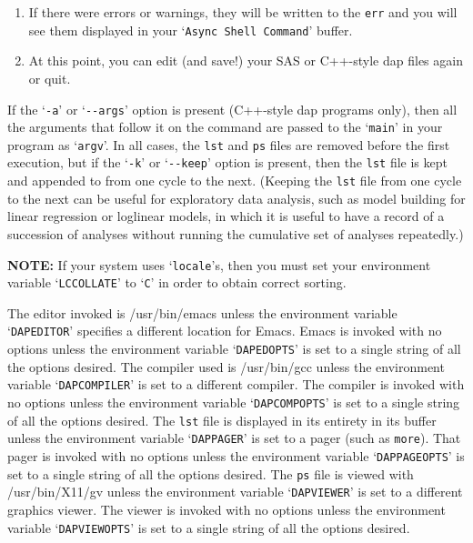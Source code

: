 \documentclass{book}
\renewcommand{\_}{\Texinfounderscore\discretionary{}{}{}}
\begin{document}
\begin{enumerate}[start=1]
\item If there were errors or warnings, they will be written
to the \texttt{err} and you will see them displayed in your
`\texttt{Async Shell Command}' buffer.

\item At this point, you can edit (and save!) your SAS or C++-style dap files again or quit.
\end{enumerate}

If the `\texttt{-a}' or `\texttt{{-}{-}args}'
%
%
option is present (C++-style dap programs only),
then all the arguments that follow it on the command
are passed to the `\texttt{main}' in your program as `\texttt{argv}'.
In all cases, the \texttt{lst} and \texttt{ps} files
%
%
are removed before the
first execution, but if the `\texttt{-k}' or `\texttt{{-}{-}keep}' option is present, then the \texttt{lst}
file is kept
%
and appended to from one cycle to the next.  
(Keeping the \texttt{lst} file from one cycle to the next can be useful for
exploratory data analysis,
%
%
such as model building for linear regression
or loglinear models, in which it is useful to have a record of a
succession of analyses without running the cumulative set of analyses
repeatedly.)

\textbf{NOTE:} If your system uses `\texttt{locale}'s, then you must set
your environment variable `\texttt{LC\_COLLATE}' to `\texttt{C}' in order to
obtain correct sorting.

The editor
%
invoked is /usr/bin/emacs unless the environment variable `\texttt{DAPEDITOR}'
specifies a different location for Emacs.
Emacs is invoked with no options unless the environment variable
`\texttt{DAPEDOPTS}' is set to a single string of all the options desired.  
The compiler
%
used is /usr/bin/gcc unless the environment variable `\texttt{DAPCOMPILER}'
is set to a different compiler.
The compiler is invoked with no options unless the environment variable
`\texttt{DAPCOMPOPTS}' is set to a single string of all the options desired.  
The \texttt{lst} file is displayed in its entirety in its buffer
unless the environment variable `\texttt{DAPPAGER}' is set to a pager
(such as \texttt{more}).
That pager is invoked with no options unless the environment variable
`\texttt{DAPPAGEOPTS}' is set to a single string of all the options desired.  
The \texttt{ps} file is viewed
%
with /usr/bin/X11/gv unless the environment variable `\texttt{DAPVIEWER}'
is set to a different graphics viewer.
The viewer is invoked with no options unless the environment variable
`\texttt{DAPVIEWOPTS}' is set to a single string of all the options desired.  
\end{document}
